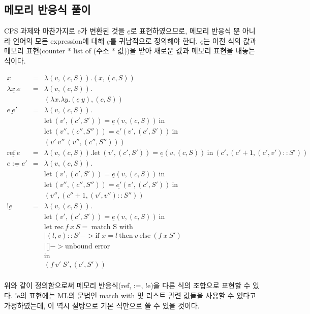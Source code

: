 \documentclass[a4paper]{article}
\begin{document}
\subsection*{메모리 반응식 풀이}
CPS 과제와 마찬가지로 e가 변환된 것을 $\underline{e}$로 표현하였으므로, 메모리 반응식 뿐 아니라 언어의 모든 expression에 대해 $\underline{e}$를 귀납적으로 정의해야 한다. $\underline{e}$는 이전 식의 값과 메모리 표현(counter * list of (주소 * 값))을 받아 새로운 값과 메모리 표현을 내놓는 식이다.

\begin{eqnarray*}
	\underline{x} & = & \lambda(v, (c,S)).(x, (c,S)) \\
	\underline{\lambda x.e} & = & \lambda(v, (c,S)). \\
	& & (\lambda x. \lambda y.(\underline{e}\ y), (c, S)) \\
	\underline{e\ e'} & = & \lambda(v, (c,S)). \\
	& & \textrm{let}\ (v',(c',S')) = \underline{e}(v,(c,S))\ \textrm{in} \\
	& & \textrm{let}\ (v'',(c'',S'')) = \underline{e'}(v',(c',S'))\ \textrm{in} \\
	& & (v'\ v''\ (v'',(c'',S''))) \\
	\underline{\textrm{ref}\ e} & = & \lambda(v, (c,S)).\textrm{let}\ (v',(c',S'))=\underline{e}(v,(c,S))\ \textrm{in}\ (c',(c'+1, (c',v')::S')) \\
	\underline{e := e'} & = & \lambda(v,(c,S)). \\
	& & \textrm{let}\ (v',(c',S')) = \underline{e}(v,(c,S))\ \textrm{in} \\
	& & \textrm{let}\ (v'',(c'',S'')) = \underline{e'}(v',(c',S'))\ \textrm{in} \\
	& & (v'', (c'' + 1,(v',v'')::S'')) \\
	\underline{!e} & = & \lambda(v,(c,S)). \\
	& & \textrm{let}\ (v',(c',S'))=\underline{e}(v,(c,S))\ \textrm{in} \\
	& & \textrm{let rec}\ f\ x\ S =\ \textrm{match S with} \\ 
	& &| (l, v)::S' -> \textrm{if } x = l\ \textrm{then}\ v\ \textrm{else}\ (f\ x\ S') \\
	& &| \textrm{[]} -> \textrm{unbound error} \\
	& &\textrm{in} \\	
	& & (f\ v'\ S', (c', S')) \\
\end{eqnarray*}

위와 같이 정의함으로써 메모리 반응식(ref, :=, !e)을 다른 식의 조합으로 표현할 수 있다. !e의 표현에는 ML의 문법인 match with 및 리스트 관련 값들을 사용할 수 있다고 가정하였는데, 이 역시 설탕으로 기본 식만으로 쓸 수 있을 것이다.
\end{document}
